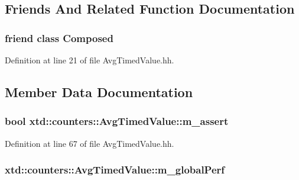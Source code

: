 \subsection{Friends And Related Function Documentation}
\subsubsection[{\texorpdfstring{Composed}{Composed}}]{\setlength{\rightskip}{0pt plus 5cm}friend class {\bf Composed}\hspace{0.3cm}{\ttfamily [friend]}}\hypertarget{classxtd_1_1counters_1_1AvgTimedValue_a93e934ad70d5b32b14beed5572450abf}{}\label{classxtd_1_1counters_1_1AvgTimedValue_a93e934ad70d5b32b14beed5572450abf}


Definition at line 21 of file Avg\+Timed\+Value.\+hh.



\subsection{Member Data Documentation}
\subsubsection[{\texorpdfstring{m\+\_\+assert}{m_assert}}]{\setlength{\rightskip}{0pt plus 5cm}bool xtd\+::counters\+::\+Avg\+Timed\+Value\+::m\+\_\+assert}\hypertarget{classxtd_1_1counters_1_1AvgTimedValue_a6e4edcfa3fcd639b23195119f2b28bd3}{}\label{classxtd_1_1counters_1_1AvgTimedValue_a6e4edcfa3fcd639b23195119f2b28bd3}


Definition at line 67 of file Avg\+Timed\+Value.\+hh.

\subsubsection[{\texorpdfstring{m\+\_\+global\+Perf}{m_globalPerf}}]{ xtd\+::counters\+::\+Avg\+Timed\+Value\+::m\+\_\+global\+Perf}\hypertarget{classxtd_1_1counters_1_1AvgTimedValue_ad0b3148989210f269416e5af2169278e}{}\label{classxtd_1_1counters_1_1AvgTimedValue_ad0b3148989210f269416e5af2169278e}


